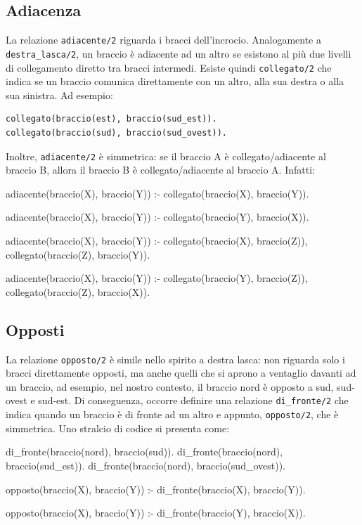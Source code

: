 \subsection{Adiacenza}
La relazione \texttt{adiacente/2} riguarda i bracci dell'incrocio. Analogamente a \texttt{destra\_lasca/2}, un braccio è adiacente ad un altro se esistono al più due livelli di collegamento diretto tra bracci intermedi. Esiste quindi \texttt{collegato/2} che indica se un braccio comunica direttamente con un altro, alla sua destra o alla sua sinistra. Ad esempio:
\begin{verbatim}
collegato(braccio(est), braccio(sud_est)).
collegato(braccio(sud), braccio(sud_ovest)).
\end{verbatim}

Inoltre, \texttt{adiacente/2} è simmetrica: se il braccio A è collegato/adiacente al braccio B, allora il braccio B è collegato/adiacente al braccio A. Infatti:

\begin{verbatimtab}
adiacente(braccio(X), braccio(Y)) :-
	collegato(braccio(X), braccio(Y)).

adiacente(braccio(X), braccio(Y)) :-
	collegato(braccio(Y), braccio(X)).

adiacente(braccio(X), braccio(Y)) :-
	collegato(braccio(X), braccio(Z)),
	collegato(braccio(Z), braccio(Y)).

adiacente(braccio(X), braccio(Y)) :-
	collegato(braccio(Y), braccio(Z)),
	collegato(braccio(Z), braccio(X)).
\end{verbatimtab}

\subsection{Opposti}
La relazione \texttt{opposto/2} è simile nello spirito a destra lasca: non riguarda solo i bracci direttamente opposti, ma anche quelli che si aprono a ventaglio davanti ad un braccio, ad esempio, nel nostro contesto, il braccio nord è opposto a sud, sud-ovest e sud-est. Di conseguenza, occorre definire una relazione \texttt{di\_fronte/2} che indica quando un braccio è di fronte ad un altro e appunto, \texttt{opposto/2}, che è simmetrica. Uno stralcio di codice si presenta come:

\begin{verbatimtab}
di_fronte(braccio(nord), braccio(sud)).
di_fronte(braccio(nord), braccio(sud_est)).
di_fronte(braccio(nord), braccio(sud_ovest)).

opposto(braccio(X), braccio(Y)) :-
	di_fronte(braccio(X), braccio(Y)).

opposto(braccio(X), braccio(Y)) :-
	di_fronte(braccio(Y), braccio(X)).
\end{verbatimtab}

